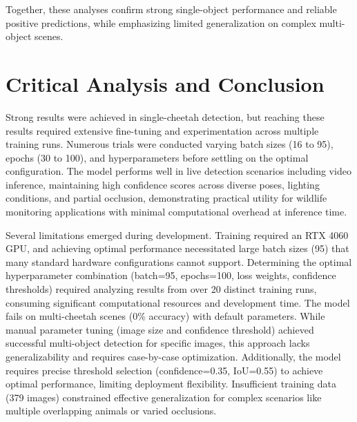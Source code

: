 \documentclass[conference]{IEEEtran}
\begin{document}
Together, these analyses confirm strong single-object performance and reliable positive predictions, while emphasizing limited generalization on complex multi-object scenes.

\section{Critical Analysis and Conclusion}

Strong results were achieved in single-cheetah detection, but reaching these results required extensive fine-tuning and experimentation across multiple training runs. Numerous trials were conducted varying batch sizes (16 to 95), epochs (30 to 100), and hyperparameters before settling on the optimal configuration. The model performs well in live detection scenarios including video inference, maintaining high confidence scores across diverse poses, lighting conditions, and partial occlusion, demonstrating practical utility for wildlife monitoring applications with minimal computational overhead at inference time.

Several limitations emerged during development. Training required an RTX 4060 GPU, and achieving optimal performance necessitated large batch sizes (95) that many standard hardware configurations cannot support. Determining the optimal hyperparameter combination (batch=95, epochs=100, loss weights, confidence thresholds) required analyzing results from over 20 distinct training runs, consuming significant computational resources and development time. The model fails on multi-cheetah scenes (0\% accuracy) with default parameters. While manual parameter tuning (image size and confidence threshold) achieved successful multi-object detection for specific images, this approach lacks generalizability and requires case-by-case optimization. Additionally, the model requires precise threshold selection (confidence=0.35, IoU=0.55) to achieve optimal performance, limiting deployment flexibility. Insufficient training data (379 images) constrained effective generalization for complex scenarios like multiple overlapping animals or varied occlusions.
\end{document}
